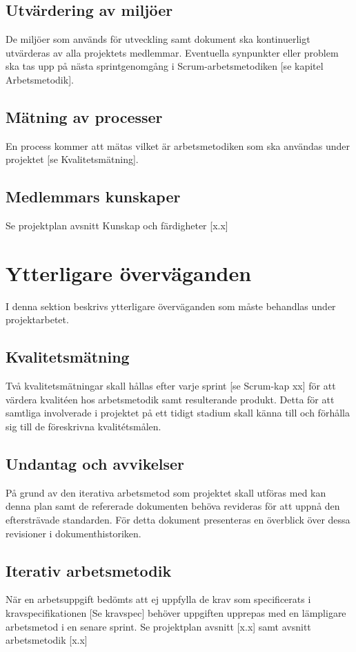 \documentclass[a4paper,10pt]{article}
\begin{document}
\subsection{Utvärdering av miljöer}
De miljöer som används för utveckling samt dokument ska kontinuerligt utvärderas av alla projektets medlemmar. Eventuella synpunkter eller problem ska tas upp på nästa sprintgenomgång i Scrum-arbetsmetodiken [se kapitel Arbetsmetodik].

\subsection{Mätning av processer}
En process kommer att mätas vilket är arbetsmetodiken som ska användas under projektet [se Kvalitetsmätning].

\subsection{Medlemmars kunskaper}
Se projektplan avsnitt Kunskap och färdigheter [x.x]

\section{Ytterligare överväganden}
\vspace{5mm}
I denna sektion beskrivs ytterligare överväganden som måste behandlas under projektarbetet.
\subsection{Kvalitetsmätning}
\label{sec:Kvalitetsmatning}
Två kvalitetsmätningar skall hållas efter varje sprint [se Scrum-kap xx] för att värdera kvalitéen hos arbetsmetodik samt resulterande produkt. 
Detta för att samtliga involverade i  projektet på ett tidigt stadium skall känna till och förhålla sig till de föreskrivna kvalitétsmålen.

\subsection{Undantag och avvikelser}
På grund av den iterativa arbetsmetod som projektet skall utföras med kan denna plan samt de refererade dokumenten behöva revideras för att uppnå den eftersträvade standarden. För detta dokument presenteras en överblick över dessa revisioner i dokumenthistoriken.

\subsection{Iterativ arbetsmetodik}
När en arbetsuppgift bedömts att ej uppfylla de krav som specificerats i kravspecifikationen [Se kravspec] behöver uppgiften upprepas med en lämpligare arbetsmetod i en senare sprint. Se projektplan avsnitt [x.x] samt avsnitt arbetsmetodik [x.x]
\end{document}
